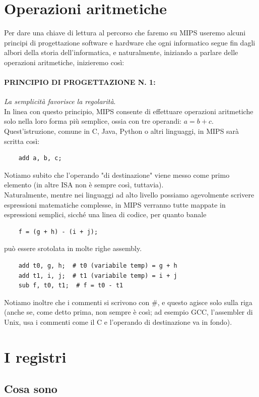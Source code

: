 \documentclass[class=book, crop=false]{standalone}
\begin{document}
\section{Operazioni aritmetiche}
Per dare una chiave di lettura al percorso che faremo su MIPS useremo alcuni principi di progettazione software e hardware che ogni informatico segue fin dagli albori della storia dell'informatica, e naturalmente, iniziando a parlare delle operazioni aritmetiche,  inizieremo così:

\paragraph{PRINCIPIO DI PROGETTAZIONE N. 1:}
\emph{La semplicità favorisce la regolarità}.\\

In linea con questo principio, MIPS consente di effettuare operazioni aritmetiche solo nella loro forma più semplice, ossia con tre operandi: \(a = b + c\).
Quest'istruzione, comune in C, Java, Python o altri linguaggi, in MIPS sarà scritta così:
\begin{verbatim}
	add a, b, c;
\end{verbatim}

Notiamo subito che l'operando "di destinazione" viene messo come primo elemento (in altre ISA non è sempre così, tuttavia).\\
Naturalmente, mentre nei linguaggi ad alto livello possiamo agevolmente scrivere espressioni matematiche complesse, in MIPS verranno tutte mappate in espressioni semplici, sicché una linea di codice, per quanto banale
\begin{verbatim}
	f = (g + h) - (i + j);
\end{verbatim}
può essere srotolata in molte righe assembly.
\begin{verbatim}
	add t0, g, h;  # t0 (variabile temp) = g + h
	add t1, i, j;  # t1 (variabile temp) = i + j
	sub f, t0, t1;  # f = t0 - t1
\end{verbatim}
Notiamo inoltre che i commenti si scrivono con \#, e questo agisce solo sulla riga (anche se, come detto prima, non sempre è così; ad esempio GCC, l'assembler di Unix, usa i commenti come il C e l'operando di destinazione va in fondo).

\section{I registri}

\subsection{Cosa sono}
\end{document}
